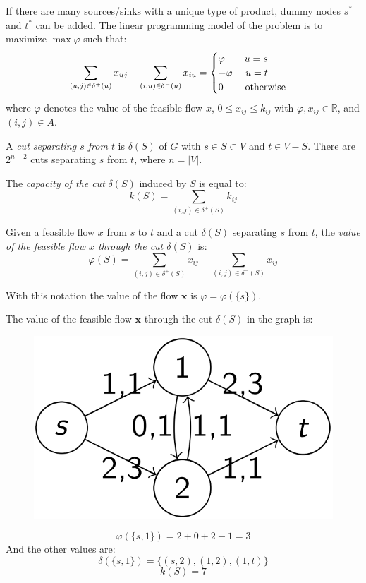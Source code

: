 \documentclass[12pt, a4paper]{report}
\begin{document}
    If there are many sources/sinks with a unique type of product, dummy nodes $s^{*}$ and $t^{*}$ can be added. The linear programming model of the problem is to maximize 
    $\max \varphi$ such that: 
    \[\sum_{(u,j)\in \delta^{+}(u)}x_{uj}-\sum_{(i,u)\in \delta^{-}(u)}x_{iu}=
    \begin{cases}
        \varphi \:\:\:\:\:\:\:\:\: u=s    \\
        -\varphi \:\:\:\:\:\: u=t   \\
        0 \:\:\:\:\:\:\:\:\:\: \textnormal{otherwise}
    \end{cases}\]
    where $\varphi$ denotes the value of the feasible flow $x$, $0 \leq x_{ij} \leq k_{ij}$ with $\varphi,x_{ij} \in \mathbb{R}$, and $(i,j) \in A$.
    \begin{definition}
        A \emph{cut separating $s$ from $t$} is $\delta(S)$ of $G$ with $s \in S \subset V$ and $t \in V-S$. There are $2^{n-2}$ cuts separating $s$ from $t$, where 
        $n=\left\lvert V \right\rvert $.

        The \emph{capacity of the cut} $\delta(S)$ induced by $S$ is equal to: 
        \[k(S)=\sum_{(i,j)\in \delta^{+}(S)}k_{ij}\]

        Given a feasible flow $x$ from $s$ to $t$ and a cut $\delta(S)$ separating $s$ from $t$, the \emph{value of the feasible flow $x$ through the cut $\delta(S)$} is: 
        \[\varphi(S)=\sum_{(i,j)\in \delta^{+}(S)}x_{ij} - \sum_{(i,j)\in \delta^{-}(S)}x_{ij}\]
    \end{definition}
    With this notation the value of the flow $\boldsymbol{x}$ is $\varphi = \varphi(\{s\})$. 
    \begin{example}
        The value of the feasible flow $\boldsymbol{x}$ through the cut $\delta(S)$ in the graph is: 
        \begin{figure}[H]
            \centering
            \includegraphics[width=0.4\linewidth]{images/flow.png}
        \end{figure}
        \[\varphi(\{s,1\})=2+0+2-1=3\]
        And the other values are: 
        \[\delta(\{s,1\})=\{(s, 2),(1,2),(1, t)\}\]
        \[k(S)=7\]
    \end{example}
\end{document}
